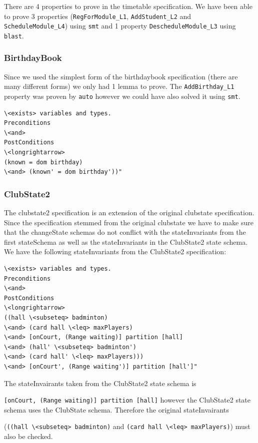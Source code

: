 There are 4 properties to prove in the timetable specification. We have been able to prove 3 properties (\verb|RegForModule_L1|, \verb|AddStudent_L2| and \verb|ScheduleModule_L4|) using \verb|smt| and 1 property \verb|DescheduleModule_L3| using \verb|blast|.

\subsubsection{BirthdayBook}

Since we used the simplest form of the birthdaybook specification (there are many different forms) we only had 1 lemma to prove. The \verb|AddBirthday_L1| property was proven by \verb|auto| however we could have also solved it using \verb|smt|.

\begin{verbatim}
\<exists> variables and types.
Preconditions
\<and>
PostConditions
\<longrightarrow>
(known = dom birthday)
\<and> (known' = dom birthday'))"
\end{verbatim}

\subsubsection{ClubState2}

The clubstate2 specification is an extension of the original clubstate specification. Since the specification stemmed from the original clubstate we have to make sure that the changeState schemas do not conflict with the stateInvariants from the first stateSchema as well as the stateInvariants in the ClubState2 state schema. We have the following stateInvariants from the ClubState2 specification:

\begin{verbatim}
\<exists> variables and types.
Preconditions
\<and>
PostConditions
\<longrightarrow>
((hall \<subseteq> badminton)
\<and> (card hall \<leq> maxPlayers)
\<and> [onCourt, (Range waiting)] partition [hall]
\<and> (hall' \<subseteq> badminton')
\<and> (card hall' \<leq> maxPlayers)))
\<and> [onCourt', (Range waiting')] partition [hall']"
\end{verbatim}

The stateInvairants taken from the ClubState2 state schema is

 \verb|[onCourt, (Range waiting)] partition [hall]| however the ClubState2 state schema uses the ClubState schema. Therefore the original stateInvairants

(\verb|((hall \<subseteq> badminton)| and \verb|(card hall \<leq> maxPlayers)|) must also be checked.

